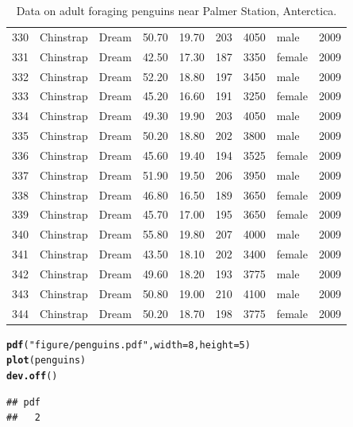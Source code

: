 \documentclass{article}\usepackage[]{graphicx}\usepackage[]{xcolor}
\makeatletter
\newcommand{\hlnum}[1]{\textcolor[rgb]{0.686,0.059,0.569}{#1}}%
\newcommand{\hlsng}[1]{\textcolor[rgb]{0.192,0.494,0.8}{#1}}%
\newcommand{\hldef}[1]{\textcolor[rgb]{0.345,0.345,0.345}{#1}}%
\newcommand{\hlkwc}[1]{\textcolor[rgb]{0.333,0.667,0.333}{#1}}%
\newcommand{\hlkwd}[1]{\textcolor[rgb]{0.737,0.353,0.396}{\textbf{#1}}}%
\newenvironment{kframe}{%
 \def\at@end@of@kframe{}%
 \ifinner\ifhmode%
  \def\at@end@of@kframe{\end{minipage}}%
  \begin{minipage}{\columnwidth}%
 \fi\fi%
 \def\FrameCommand##1{\hskip\@totalleftmargin \hskip-\fboxsep
 \colorbox{shadecolor}{##1}\hskip-\fboxsep
     \hskip-\linewidth \hskip-\@totalleftmargin \hskip\columnwidth}%
 \MakeFramed {\advance\hsize-\width
   \@totalleftmargin\z@ \linewidth\hsize
   \@setminipage}}%
 {\par\unskip\endMakeFramed%
 \at@end@of@kframe}
\newenvironment{knitrout}{}{} %
\makeatother
\begin{document}
\begin{table}[ht]
\begin{tabular}{rllrrrrlr}
  330 & Chinstrap & Dream & 50.70 & 19.70 & 203 & 4050 & male & 2009 \\ 
  331 & Chinstrap & Dream & 42.50 & 17.30 & 187 & 3350 & female & 2009 \\ 
  332 & Chinstrap & Dream & 52.20 & 18.80 & 197 & 3450 & male & 2009 \\ 
  333 & Chinstrap & Dream & 45.20 & 16.60 & 191 & 3250 & female & 2009 \\ 
  334 & Chinstrap & Dream & 49.30 & 19.90 & 203 & 4050 & male & 2009 \\ 
  335 & Chinstrap & Dream & 50.20 & 18.80 & 202 & 3800 & male & 2009 \\ 
  336 & Chinstrap & Dream & 45.60 & 19.40 & 194 & 3525 & female & 2009 \\ 
  337 & Chinstrap & Dream & 51.90 & 19.50 & 206 & 3950 & male & 2009 \\ 
  338 & Chinstrap & Dream & 46.80 & 16.50 & 189 & 3650 & female & 2009 \\ 
  339 & Chinstrap & Dream & 45.70 & 17.00 & 195 & 3650 & female & 2009 \\ 
  340 & Chinstrap & Dream & 55.80 & 19.80 & 207 & 4000 & male & 2009 \\ 
  341 & Chinstrap & Dream & 43.50 & 18.10 & 202 & 3400 & female & 2009 \\ 
  342 & Chinstrap & Dream & 49.60 & 18.20 & 193 & 3775 & male & 2009 \\ 
  343 & Chinstrap & Dream & 50.80 & 19.00 & 210 & 4100 & male & 2009 \\ 
  344 & Chinstrap & Dream & 50.20 & 18.70 & 198 & 3775 & female & 2009 \\ 
   \hline
\end{tabular}
\caption{ Data on adult foraging penguins near Palmer Station, Anterctica.} 
\label{penguins.tab}
\end{table}

\begin{knitrout}\scriptsize
{}\color{fgcolor}\begin{kframe}
\begin{alltt}
\hlkwd{pdf}\hldef{(}\hlsng{"figure/penguins.pdf"}\hldef{,} \hlkwc{width} \hldef{=} \hlnum{8}\hldef{,} \hlkwc{height} \hldef{=} \hlnum{5}\hldef{)}
\hlkwd{plot}\hldef{(penguins)}
\hlkwd{dev.off}\hldef{()}
\end{alltt}
\begin{verbatim}
## pdf 
##   2
\end{verbatim}
\end{kframe}
\end{knitrout}
\end{document}
